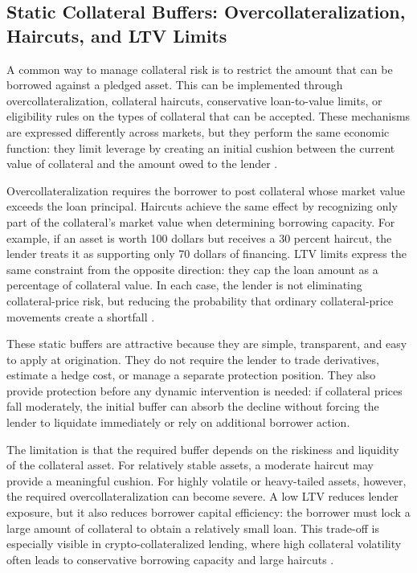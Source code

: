 \documentclass[11pt]{article}
\begin{document}
\subsection{Static Collateral Buffers: Overcollateralization, Haircuts, and LTV Limits}

A common way to manage collateral risk is to restrict the amount that can be borrowed against a pledged asset. This can be implemented through overcollateralization, collateral haircuts, conservative loan-to-value limits, or eligibility rules on the types of collateral that can be accepted. These mechanisms are expressed differently across markets, but they perform the same economic function: they limit leverage by creating an initial cushion between the current value of collateral and the amount owed to the lender \citep{geanakoplos_2010_leverage,gorton_metrick_2012_repo}.

Overcollateralization requires the borrower to post collateral whose market value exceeds the loan principal. Haircuts achieve the same effect by recognizing only part of the collateral’s market value when determining borrowing capacity. For example, if an asset is worth 100 dollars but receives a 30 percent haircut, the lender treats it as supporting only 70 dollars of financing. LTV limits express the same constraint from the opposite direction: they cap the loan amount as a percentage of collateral value. In each case, the lender is not eliminating collateral-price risk, but reducing the probability that ordinary collateral-price movements create a shortfall \citep{gorton_metrick_2012_repo, baklanova_2016_collateral}.

These static buffers are attractive because they are simple, transparent, and easy to apply at origination. They do not require the lender to trade derivatives, estimate a hedge cost, or manage a separate protection position. They also provide protection before any dynamic intervention is needed: if collateral prices fall moderately, the initial buffer can absorb the decline without forcing the lender to liquidate immediately or rely on additional borrower action.

The limitation is that the required buffer depends on the riskiness and liquidity of the collateral asset. For relatively stable assets, a moderate haircut may provide a meaningful cushion. For highly volatile or heavy-tailed assets, however, the required overcollateralization can become severe. A low LTV reduces lender exposure, but it also reduces borrower capital efficiency: the borrower must lock a large amount of collateral to obtain a relatively small loan. This trade-off is especially visible in crypto-collateralized lending, where high collateral volatility often leads to conservative borrowing capacity and large haircuts \citep{chiu_2023_defi_fragility}.
\end{document}
